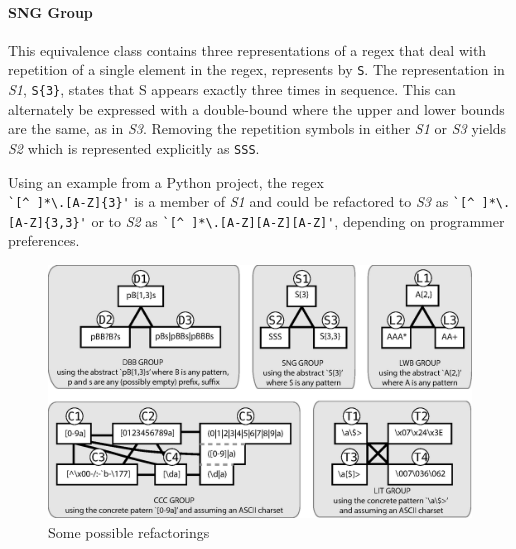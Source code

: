 \paragraph{SNG Group} This equivalence class contains  three representations of a regex that  deal with repetition of a single element in the regex, represents by \verb!S!. The representation in \emph{S1}, \verb!S{3}!, states that S appears exactly three times in sequence. This can alternately be expressed with a double-bound where the upper and lower bounds are the same, as in \emph{S3}. Removing the repetition symbols in either \emph{S1} or \emph{S3} yields \emph{S2} which is represented explicitly as  \verb!SSS!.

Using an example from a Python project, the regex\\ \verb!`[^ ]*\.[A-Z]{3}'! is a member of \emph{S1} and could be refactored to \emph{S3} as \verb!`[^ ]*\.[A-Z]{3,3}'!  or to \emph{S2} as \verb!`[^ ]*\.[A-Z][A-Z][A-Z]'!, depending on programmer preferences.





\begin{figure}[tb]
\centering
\includegraphics[width=\textwidth]{illustrations/refactoringTree.eps}
\vspace{-12pt}
\caption{Some possible refactorings}
\vspace{-6pt}
\label{fig:refactoringTree}
\end{figure}















